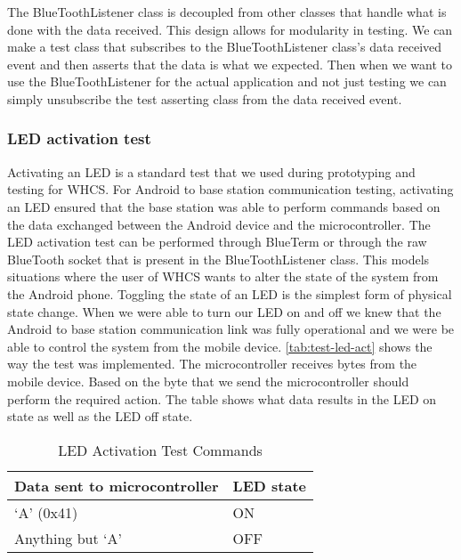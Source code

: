The BlueToothListener class is decoupled from other classes that handle what is
done with the data received. This design allows for modularity in testing.
We can make a test class that subscribes to the BlueToothListener class{}'s
data received event and then asserts that the data is what we expected. Then
when we want to use the BlueToothListener for the actual application and not
just testing we can simply unsubscribe the test asserting class from the data
received event.

\subsubsection{LED activation test}
Activating an LED is a standard test that we used during prototyping and
testing for WHCS. For Android to base station communication testing, activating
an LED ensured that the base station was able to perform commands based on the
data exchanged between the Android device and the microcontroller. The LED
activation test can be performed through BlueTerm or through the raw BlueTooth
socket that is present in the BlueToothListener class. This models
situations where the user of WHCS wants to alter the state of the system from
the Android phone. Toggling the state of an LED is the simplest form of
physical state change. When we were able to turn our LED on and off we knew that
the Android to base station communication link was fully operational and we were
be able to control the system from the mobile device.  \autoref{tab:test-led-act}
shows the way the test was implemented. The microcontroller receives
bytes from the mobile device. Based on the byte that we send the
microcontroller should perform the required action. The table shows what data
results in the LED on state as well as the LED off state.

\begin{table}[H]
\centering
\begin{tabular}{|l|l|}
\hline
{\color{black} Data sent to microcontroller} &
{\color{black} LED state}\\\hline
{\color{black} {}`A{}' (0x41)} &
{\color{black} ON}\\\hline
{\color{black} Anything but {}`A{}'} &
{\color{black} OFF}\\\hline
\end{tabular}
\caption{LED Activation Test Commands}
\label{tab:test-led-act}
\end{table}
